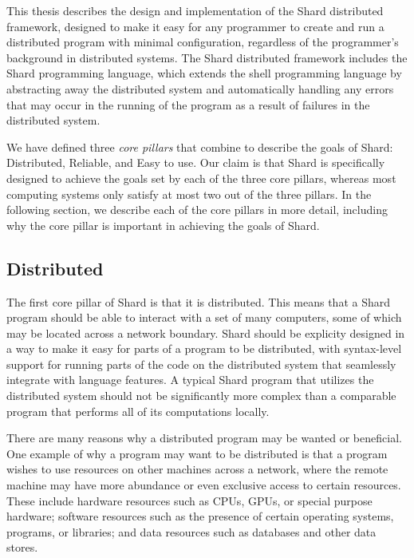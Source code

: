 \documentclass[twoside]{report}
\begin{document}
This thesis describes the design and implementation of the Shard distributed framework, designed to make it easy for any programmer to create and run a distributed program with minimal configuration, regardless of the programmer's background in distributed systems. The Shard distributed framework includes the Shard programming language, which extends the shell programming language by abstracting away the distributed system and automatically handling any errors that may occur in the running of the program as a result of failures in the distributed system.

We have defined three \textit{core pillars} that combine to describe the goals of Shard: Distributed, Reliable, and Easy to use. Our claim is that Shard is specifically designed to achieve the goals set by each of the three core pillars, whereas most computing systems only satisfy at most two out of the three pillars.
In the following section, we describe each of the core pillars in more detail, including why the core pillar is important in achieving the goals of Shard.

\subsection{Distributed}

The first core pillar of Shard is that it is distributed.
This means that a Shard program should be able to interact with a set of many computers, some of which may be located across a network boundary.
Shard should be explicity designed in a way to make it easy for parts of a program to be distributed, with syntax-level support for running parts of the code on the distributed system that seamlessly integrate with language features.
A typical Shard program that utilizes the distributed system should not be significantly more complex than a comparable program that performs all of its computations locally.

There are many reasons why a distributed program may be wanted or beneficial.
One example of why a program may want to be distributed is that a program wishes to use resources on other machines across a network, where the remote machine may have more abundance or even exclusive access to certain resources.
These include hardware resources such as CPUs, GPUs, or special purpose hardware; software resources such as the presence of certain operating systems, programs, or libraries; and data resources such as databases and other data stores.
\end{document}
